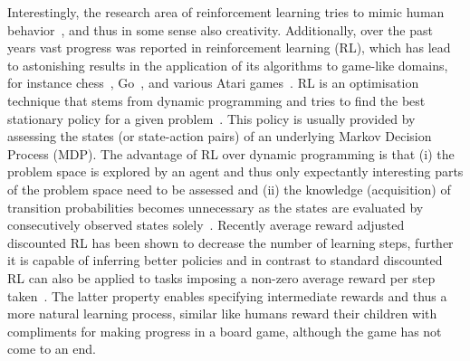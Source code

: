 \documentclass[envcountsame]{llncs}
\begin{document}
Interestingly, the research area of reinforcement learning tries to mimic human
behavior~\cite{schneckenreither2020average}, and thus in some sense also creativity. Additionally,
over the past years vast progress was reported in reinforcement learning (RL), which has lead to
astonishing results in the application of its algorithms to game-like domains, for instance
chess~\cite{Silver17_MasteringChessAndShogiBySelfPlayWithAGeneralReinforcementLearningAlgorithm},
Go~\cite{Silver16_MasteringTheGameOfGoWithDeepNeuralNetworksAndTreeSearch}, and various Atari
games~\cite{Mnih15_HumanlevelControlThroughDeepReinforcementLearningb}. RL is an optimisation
technique that stems from dynamic programming and tries to find the best stationary policy for a
given problem~\cite{sutton1998introduction}. This policy is usually provided by assessing the states
(or state-action pairs) of an underlying Markov Decision Process (MDP). The advantage of RL over
dynamic programming is that (i) the problem space is explored by an agent and thus only expectantly
interesting parts of the problem space need to be assessed and (ii) the knowledge (acquisition) of
transition probabilities becomes unnecessary as the states are evaluated by consecutively observed
states solely~\cite{sutton1998introduction}. Recently average reward adjusted discounted RL has been
shown to decrease the number of learning steps, further it is capable of inferring better policies
and in contrast to standard discounted RL can also be applied to tasks imposing a non-zero average
reward per step taken~\cite{schneckenreither2020average}. The latter property enables specifying
intermediate rewards and thus a more natural learning process, similar like humans reward their
children with compliments for making progress in a board game, although the game has not come to an
end.
\end{document}
